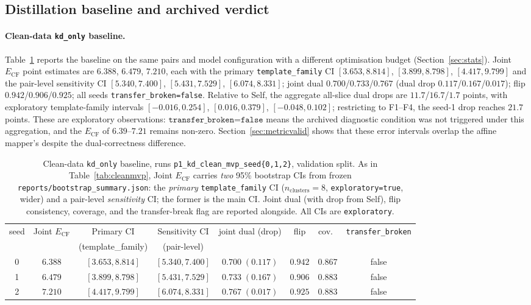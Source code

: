 \documentclass[11pt,twocolumn]{article}
\begin{document}
\subsection{Distillation baseline and archived verdict}
\label{sec:kdbase}

\paragraph{Clean-data \texttt{kd\_only} baseline.}
Table~\ref{tab:cleankd} reports the baseline on the same pairs and model
configuration with a different optimisation budget (Section~\ref{sec:stats}).
Joint $E_{\mathrm{CF}}$ point estimates are $6.388$, $6.479$, $7.210$, each with
the primary \texttt{template\_family} CI $[3.653,8.814]$, $[3.899,8.798]$,
$[4.417,9.799]$ and the pair-level sensitivity CI $[5.340,7.400]$,
$[5.431,7.529]$, $[6.074,8.331]$; joint dual $0.700$/$0.733$/$0.767$ (dual drop
$0.117$/$0.167$/$0.017$); flip $0.942$/$0.906$/$0.925$; all seeds
\texttt{transfer\_broken=false}. Relative to Self, the aggregate all-slice dual
drops are $11.7$/$16.7$/$1.7$ points, with exploratory template-family intervals
$[-0.016,0.254]$, $[0.016,0.379]$, $[-0.048,0.102]$; restricting to F1--F4, the
seed-1 drop reaches $21.7$ points. These are exploratory observations:
$\texttt{transfer\_broken=false}$ means the archived diagnostic condition was
not triggered under this aggregation, and the $E_{\mathrm{CF}}$ of
$6.39$--$7.21$ remains non-zero. Section~\ref{sec:metricvalid} shows that these
error intervals overlap the affine mapper's despite the dual-correctness
difference.

\begin{table}[t]
\centering
\caption{Clean-data \texttt{kd\_only} baseline, runs
\texttt{p1\_kd\_clean\_mvp\_seed\{0,1,2\}}, validation
split. As in Table~\ref{tab:cleanmvp}, Joint $E_{\mathrm{CF}}$ carries \emph{two}
95\% bootstrap CIs from frozen \texttt{reports/bootstrap\_summary.json}: the
\emph{primary} \texttt{template\_family} CI ($n_{\mathrm{clusters}}=8$,
\texttt{exploratory=true}, wider) and a pair-level \emph{sensitivity} CI; the
former is the main CI. Joint dual (with drop from Self), flip
consistency, coverage, and the transfer-break flag are reported alongside. All
CIs are \texttt{exploratory}.}
\label{tab:cleankd}
\small
\begin{tabular}{cccccccc}
\toprule
seed & Joint $E_{\mathrm{CF}}$ & Primary CI & Sensitivity CI & joint dual (drop) & flip & cov.\ & \texttt{transfer\_broken} \\
 & & (template\_family) & (pair-level) & & & & \\
\midrule
0 & $6.388$ & $[3.653,8.814]$ & $[5.340,7.400]$ & $0.700\;(0.117)$ & $0.942$ & $0.867$ & false \\
1 & $6.479$ & $[3.899,8.798]$ & $[5.431,7.529]$ & $0.733\;(0.167)$ & $0.906$ & $0.883$ & false \\
2 & $7.210$ & $[4.417,9.799]$ & $[6.074,8.331]$ & $0.767\;(0.017)$ & $0.925$ & $0.883$ & false \\
\bottomrule
\end{tabular}
\end{table}
\end{document}
